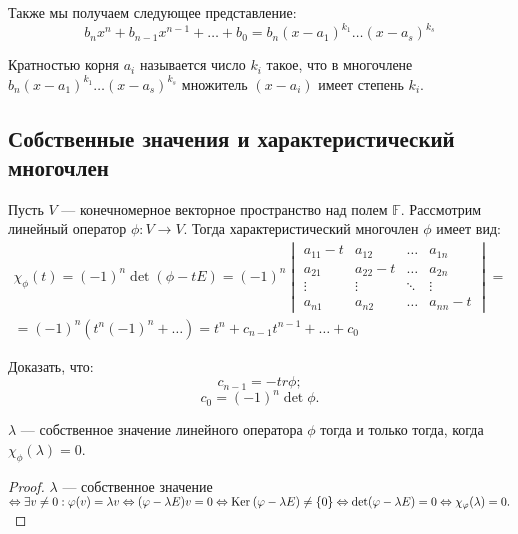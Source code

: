 Также мы получаем следующее представление:
$$
b_nx^n + b_{n-1}x^{n-1} + \ldots + b_0 = b_n(x - a_1)^{k_1}\ldots(x - a_s)^{k_s}
$$

\begin{Def}
	Кратностью корня $a_i$ называется число $k_i$ такое, что в многочлене \\$b_n(x - a_1)^{k_1}\ldots(x - a_s)^{k_s}$ множитель $(x - a_i)$ имеет степень $k_i$.
\end{Def}

\subsection*{Собственные значения и характеристический многочлен}

\begin{Def}
	Пусть $V$ --- конечномерное векторное пространство над полем $\mathbb{F}$. Рассмотрим линейный оператор $\phi: V \to V$. Тогда характеристический многочлен $\phi$ имеет вид:
	\begin{gather*}
	\chi_{\phi}(t) = (-1)^n\det(\phi - tE) = (-1)^n
  \begin{vmatrix}
  a_{11} - t & a_{12} &\ldots &a_{1n}\\
  a_{21} & a_{22} - t &\ldots &a_{2n} \\
  \vdots &\vdots &\ddots &\vdots\\
  a_{n1} &a_{n2} &\ldots & a_{nn} - t
  \end{vmatrix}
  = \\ 
  = (-1)^n(t^n(-1)^n + \ldots)  = t^n + c_{n-1}t^{n-1} + \ldots + c_0
  \end{gather*}
\end{Def}

\begin{Task}
Доказать, что:
	\[c_{n-1} = -tr\phi;\]
        \[c_0 = (-1)^n \det\phi.\]
\end{Task}

\begin{Statement}
	$\lambda$ --- собственное значение линейного оператора $\phi$ тогда и только тогда, когда $\chi_\phi(\lambda) = 0$. 
\end{Statement}

\begin{proof}
	$\lambda$ --- собственное значение $\Leftrightarrow \exists v \neq 0 : \varphi(v) = \lambda {v} \Leftrightarrow (\varphi - \lambda {E})v = 0 \Leftrightarrow \mathrm{Ker}\:(\varphi - \lambda {E}) \neq \{0\}
	\Leftrightarrow \det(\varphi - \lambda {E}) = 0 \Leftrightarrow \chi_\varphi(\lambda) = 0.$
\end{proof}


